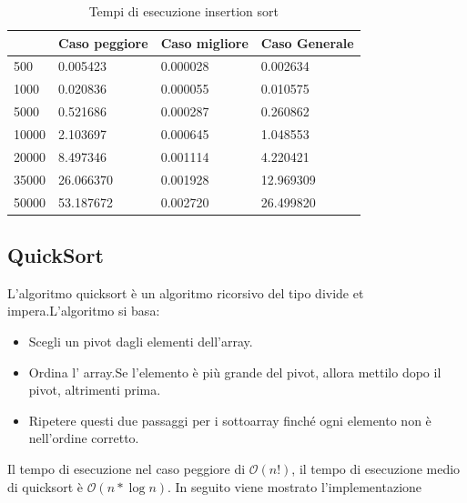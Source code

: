 \documentclass[12pt,a4paper]{report}
\begin{document}
\begin{table}[h]
\centering
\begin{tabular}{| l | l | l | l |}
\hline
           & Caso peggiore & Caso migliore & Caso Generale \\ \hline
500   & 0.005423      & 0.000028      & 0.002634      \\ \hline
1000  & 0.020836	    & 0.000055      & 0.010575      \\ \hline
5000  & 0.521686      & 0.000287     & 0.260862     \\ \hline
10000 & 2.103697      & 0.000645     & 1.048553      \\ \hline
20000 & 8.497346     & 0.001114      & 4.220421     \\ \hline
35000 & 26.066370     & 0.001928     & 12.969309     \\ \hline
50000 & 53.187672     & 0.002720   & 26.499820    \\ \hline

\end{tabular}
\caption{Tempi di esecuzione insertion sort}
\label{Tab:Tempi esecuzione InsertionSort}
\end{table}


\subsection{QuickSort}
L'algoritmo quicksort è un algoritmo ricorsivo del tipo divide et impera.L'algoritmo si basa:
\begin{itemize}
\item Scegli un pivot dagli elementi dell'array.
\item Ordina l' array.Se l'elemento è più grande del pivot, allora mettilo  dopo il pivot, altrimenti prima.
\item Ripetere questi due passaggi per i sottoarray finché ogni elemento non è nell'ordine corretto.
\end{itemize}

Il tempo di esecuzione nel caso peggiore di $\mathcal{O}(n!) $, il tempo di esecuzione medio di quicksort è $\mathcal{O}(n * \log{}n) $. In seguito viene mostrato l'implementazione 

	
\end{document}
